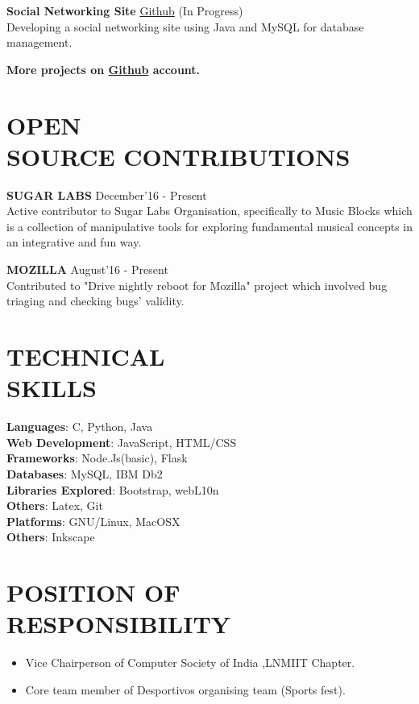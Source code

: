 \documentclass[margin]{res}
\begin{document}
\begin{resume}
  {\textbf{Social Networking Site}} \href{https://github.com/ShubhamSetia/SocialNetworkingSite}{Github} \hfill (In Progress)\\
  Developing a social networking site using Java and MySQL for database management.
  


  \textbf{More projects on \href{https://github.com/Tabs16}{Github} account.}

\section{OPEN \\ SOURCE CONTRIBUTIONS}
	{\textbf{SUGAR LABS}} \hfill December'16 - Present\\
 	Active contributor to Sugar Labs Organisation, specifically to Music Blocks which is a collection of manipulative tools for exploring fundamental musical concepts in an integrative and fun way.

 	{\textbf{MOZILLA}} \hfill August'16 - Present\\
 	Contributed to "Drive nightly reboot for Mozilla" project which involved bug triaging and checking bugs' validity.
 	




\section{TECHNICAL \\ SKILLS}

  {\textbf{Languages}:} C, Python, Java\\
  {\textbf{Web Development}:} JavaScript, HTML/CSS\\
  {\textbf{Frameworks}:} Node.Js(basic), Flask\\
  {\textbf{Databases}:} MySQL, IBM Db2\\
  {\textbf{Libraries Explored}:} Bootstrap, webL10n\\
  {\textbf{Others}:} Latex, Git\\
  {\textbf{Platforms}:} GNU/Linux, MacOSX\\
  {\textbf{Others}:} Inkscape\\

\section{POSITION OF RESPONSIBILITY }
	\begin{itemize}
		\item Vice Chairperson of Computer Society of India ,LNMIIT Chapter.	
  		\item Core team member of Desportivos organising team (Sports fest).
	\end{itemize}


\end{resume}
\end{document}
